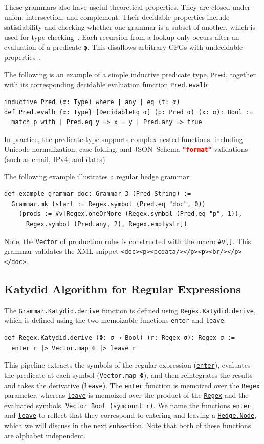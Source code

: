 \documentclass[runningheads]{llncs}
\newcommand{\link}[2]{\mbox{\hyperref[#2]{\lstinline{#1}}}\xspace}
\newcommand{\Node}{\link{Hedge.Node}{Hedge}}
\newcommand{\GrammarKatydidDerive}{\link{Grammar.Katydid.derive}{def Grammar.Katydid.derive}}
\newcommand{\Regex}{\link{Regex}{Regex}}
\newcommand{\RegexKatydidDerive}{\link{Regex.Katydid.derive}{def Regex.Katydid.derive}}
\newcommand{\enter}{\link{enter}{def enter}}
\newcommand{\leave}{\link{leave}{def leave}}
\newcommand{\JSONSchema}{%
  JSON~Schema\xspace%
}
\newcommand{\format}{%
  \lstinline[language=json]|"format"|\xspace%
}
\newcommand{\CFGs}{\acp{CFG}\xspace}
\newcommand{\XML}{\ac{XML}\xspace}
\begin{document}
These grammars also have useful theoretical properties.
They are closed under union, intersection, and complement. 
Their decidable properties include satisfiability and checking whether one grammar is a subset of another, which is used for type checking~\cite{hosoya2003xduce}.
Each recursion from a lookup only occurs after an evaluation of a predicate \lstinline{φ}.
This disallows arbitrary \CFGs with undecidable properties~\cite{hosoya2003xduce}.

The following is an example of a simple inductive predicate type, \lstinline{Pred}, together with its corresponding decidable evaluation function \lstinline{Pred.evalb}:
\begin{lstlisting}[label=AnyEqPred]
inductive Pred (α: Type) where | any | eq (t: α)
def Pred.evalb {α: Type} [DecidableEq α] (p: Pred α) (x: α): Bool :=
  match p with | Pred.eq y => x = y | Pred.any => true
\end{lstlisting}
In practice, the predicate type supports complex nested functions, including Unicode normalization, case folding, and \JSONSchema \format validations (such as email, IPv4, and dates).


The following example illustrates a regular hedge grammar:
\begin{lstlisting}[label=def example_grammar_doc]
def example_grammar_doc: Grammar 3 (Pred String) :=
  Grammar.mk (start := Regex.symbol (Pred.eq "doc", 0))
    (prods := #v[Regex.oneOrMore (Regex.symbol (Pred.eq "p", 1)),
      Regex.symbol (Pred.any, 2), Regex.emptystr])
\end{lstlisting}
Note, the \lstinline{Vector} of production rules is constructed with the macro \lstinline{#v[]}.
This grammar validates the \XML snippet \lstinline{<doc><p><pcdata/></p>}\allowbreak\lstinline{<p><br/></p></doc>}.

\subsection{Katydid Algorithm for Regular Expressions}
\label{section_enter_and_leave}

The \GrammarKatydidDerive function is defined using \RegexKatydidDerive, which is defined using the two memoizable functions \enter and \leave:
\begin{lstlisting}[label=def Regex.Katydid.derive]
def Regex.Katydid.derive (Φ: σ → Bool) (r: Regex σ): Regex σ :=
  enter r |> Vector.map Φ |> leave r
\end{lstlisting}
This pipeline extracts the symbols of the regular expression (\enter), evaluates the predicate at each symbol (\lstinline{Vector.map Φ}), and then reintegrates the results and takes the derivative (\leave).
The \enter function is memoized over the \Regex parameter, whereas \leave is memoized over the product of the \Regex and the evaluated symbols, \lstinline{Vector Bool (symcount r)}.
We name the functions \enter and \leave to reflect that they correspond to entering and leaving a \Node, which we will discuss in the next subsection.
Note that both of these functions are alphabet independent.
\end{document}
